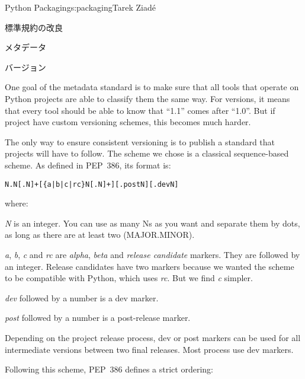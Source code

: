 \begin{aosachapter}{Python Packaging}{s:packaging}{Tarek Ziad\'{e}}
\begin{aosasect1}{標準規約の改良}
\begin{aosasect2}{メタデータ}
\begin{aosaitemize}
\end{aosaitemize}

\begin{aosasect3}{バージョン}

One goal of the metadata standard is to make sure that all tools that
operate on Python projects are able to classify them the same
way. For versions, it means that every tool should be able to know
that ``1.1'' comes after ``1.0''. But if project have custom
versioning schemes, this becomes much harder.

The only way to ensure consistent versioning is to publish a standard
that projects will have to follow.  The scheme we chose is a
classical sequence-based scheme.  As defined in PEP~386, its format
is:

\begin{verbatim}
N.N[.N]+[{a|b|c|rc}N[.N]+][.postN][.devN]
\end{verbatim}

\noindent where:

\begin{aosaitemize}

  \item \emph{N} is an integer. You can use as many Ns as you want and
  separate them by dots, as long as there are at least two
  (MAJOR.MINOR).

  \item \emph{a}, \emph{b}, \emph{c} and \emph{rc} are \emph{alpha},
  \emph{beta} and \emph{release candidate} markers. They are followed
  by an integer. Release candidates have two markers because we wanted
  the scheme to be compatible with Python, which uses \emph{rc}. But
  we find \emph{c} simpler.

  \item \emph{dev} followed by a number is a dev marker.

  \item \emph{post} followed by a number is a post-release marker.

\end{aosaitemize}

\noindent
Depending on the project release process, dev or post markers can be used for
all intermediate versions between two final releases. Most process use
dev markers.

\pagebreak

Following this scheme, PEP~386 defines a strict ordering:

\begin{aosaitemize}


\end{aosaitemize}
\end{aosasect3}
\end{aosasect2}
\end{aosasect1}
\end{aosachapter}
